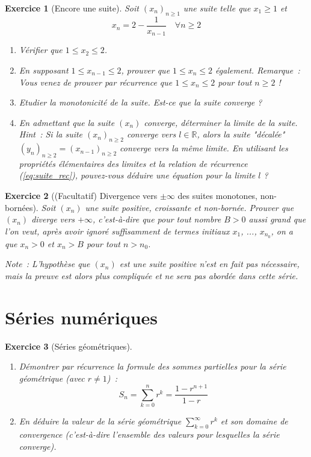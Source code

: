 \documentclass[11.5pt,french,table]{article}
\newcommand{\enumeratelinefix}{\leavevmode \vspace{-\baselineskip}} %
\theoremstyle{exercice}
\newtheorem{exercice}{Exercice}
\begin{document}
\begin{exercice}[Encore une suite]
Soit $(x_n)_{n \geq 1}$ une suite telle que $x_1 \geq 1$ et 
\begin{equation}
    x_n = 2 - \frac{1}{x_{n-1}} \quad \forall n \geq 2
    \label{eq:suite_rec}
\end{equation}
\begin{enumerate}
    \item Vérifier que $1 \leq x_2 \leq 2$.
    \item En supposant $1 \leq x_{n-1} \leq 2$, prouver que $1 \leq x_n \leq 2$ également. \newline
    \emph{Remarque~:} Vous venez de prouver \emph{par récurrence} que $1 \leq x_n \leq 2$ pour tout $n \geq 2$ ! 
    \item Etudier la monotonicité de la suite. Est-ce que la suite converge ?
    \item En admettant que la suite $(x_n)$ converge, déterminer la limite de la suite. \newline
    \emph{Hint~: Si la suite $(x_n)_{n \geq 2}$ converge vers $l \in \mathbb R$, alors la suite "décalée" $(y_n)_{n \geq 2} = (x_{n-1})_{n \geq 2}$ converge vers la même limite. En utilisant les propriétés élémentaires des limites et la relation de récurrence (\ref{eq:suite_rec}), pouvez-vous déduire une équation pour la limite $l$ ?}
\end{enumerate}

\end{exercice}
\begin{exercice}[(Facultatif) Divergence vers $\pm \infty$ des suites monotones, non-bornées]
Soit $(x_n)$ une suite positive, croissante et non-bornée. Prouver que $(x_n)$ diverge vers $+\infty$, c'est-à-dire que pour tout nombre $B > 0$ aussi grand que l'on veut, après avoir ignoré suffisamment de termes initiaux $x_1$, ..., $x_{n_0}$, on a que $x_n > 0$ et $x_n > B$ pour tout $n > n_0$.

\emph{Note~: L'hypothèse que $(x_n)$ est une suite positive n'est en fait pas nécessaire, mais la preuve est alors plus compliquée et ne sera pas abordée dans cette série.}
\end{exercice}

\part{Séries numériques}
\begin{exercice}[Séries géométriques]
\enumeratelinefix
\begin{enumerate}
    \item Démontrer par récurrence la formule des sommes partielles pour la série géométrique (avec $r \neq 1$)~:
    \[
    S_n = \sum_{k = 0}^{n} r^k = \frac{1 - r^{n+1}}{1 - r}
    \]
    \item En déduire la valeur de la série géométrique $\displaystyle\sum_{k = 0}^{\infty} r^k$ et son domaine de convergence (c'est-à-dire l'ensemble des valeurs pour lesquelles la série converge).
\end{enumerate}
\end{exercice}
\end{document}
